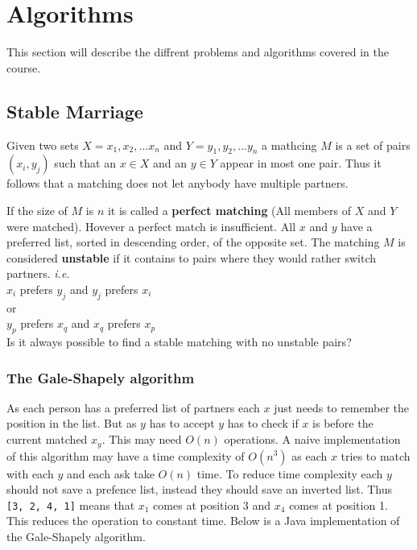 \documentclass[12pt]{article} %
\begin{document}
\section{Algorithms} %

This section will describe the diffrent problems and algorithms covered in the course.

\subsection{Stable Marriage} %
Given two sets $X = {x_{1}, x_{2}, \dots x_{n}}$ and $Y = {y_{1}, y_{2}, \dots y_{n}}$ a mathcing $M$ is a set of pairs $(x_{i}, y_{j})$ such that an $x \in X$ and an $y \in Y$ appear in most one pair. Thus it follows that a matching does not let anybody have multiple partners.

\par If the size of $M$ is $n$ it is called a \textbf{perfect matching} (All members of $X$ and $Y$ were matched). Hovever a perfect match is insufficient. All $x$ and $y$ have a preferred list, sorted in descending order, of the opposite set. The matching $M$ is considered \textbf{unstable} if it contains to pairs where they would rather switch partners. \textit{i.e.}\\
$x_{i}$ prefers $y_{j}$ and $y_{j}$ prefers $x_{i}$ \\
or \\
$y_{p}$ prefers $x_{q}$ and $x_{q}$ prefers $x_{p}$ \\
Is it always possible to find a stable matching with no unstable pairs?

\subsubsection{The Gale-Shapely algorithm}
As each person has a preferred list of partners each $x$ just needs to remember the position in the list. But as $y$ has to accept $y$ has to check if $x$ is before the current matched $x_{y}$. This may need $O(n)$ operations. A naive implementation of this algorithm may have a time complexity of $O(n^3)$ as each $x$ tries to match with each $y$ and each ask take $O(n)$ time. To reduce time complexity each $y$ should not save a prefence list, instead they should save an inverted list. Thus \texttt{[3, 2, 4, 1]} means that $x_{1}$ comes at position 3 and $x_{4}$ comes at position 1. This reduces the operation to constant time. Below is a Java implementation of the Gale-Shapely algorithm.
\end{document}
